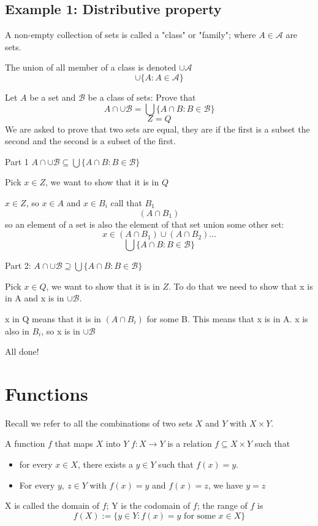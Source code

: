 \documentclass[12pt]{article}
\begin{document}
\subsection{Example 1: Distributive property}
A non-empty collection of sets is called a "class" or "family"; where $A\in\mathcal{A}$ are sets.

The union of all member of a class is denoted $\cup\mathcal{A}$
$$\cup\{A : A\in \mathcal{A}\}$$


Let $A$ be a set and $\mathcal{B}$ be a class of sets:
Prove that 
$$A\cap \cup\mathcal{B}=\bigcup\{A\cap B: B\in \mathcal{B}\}$$
$$Z=Q$$
We are asked to prove that two sets are equal, they are if the first is a subset the second and the second is a subset of the first.

Part 1 $A\cap \cup\mathcal{B}\subseteq \bigcup\{A\cap B: B\in \mathcal{B}\}$

Pick $x \in Z$, we want to show that it is in $Q$

$x \in Z$, so $x\in A$ and $x\in B_i$ call that $B_1$ 
$$(A\cap B_1)$$
so an element of a set is also the element of that set union some other set:
$$x\in(A\cap B_1)\cup(A\cap B_2)\ldots$$
$$\bigcup\{A\cap B: B\in \mathcal{B}\}$$



Part 2: $A\cap \cup\mathcal{B}\supseteq \bigcup\{A\cap B: B\in \mathcal{B}\}$

Pick $x \in Q$, we want to show that it is in $Z$.  To do that we need to show that x is in A and x is in $\cup\mathcal{B}$.

x in Q means that it is in $(A\cap B_i)$ for some B.  
This means that x is in A.
x is also in $B_i$, so x is in $\cup\mathcal{B}$

All done!
\pagebreak
\section{Functions}
Recall we refer to all the combinations of two sets $X$ and $Y$ with $X\times Y$.

A function $f$ that maps $X$ into $Y$ $f: X\rightarrow Y$
is a relation $f\subseteq X\times Y$ such that
\begin{itemize}
\item for every $x\in X$, there exists a $y \in Y$ such that $f(x)=y $.
\item For every $y,\ z \in Y$ with $f(x)=y $ and $f(x)=z $, we have $y=z$
\end{itemize}
X is called the domain of $f$; Y is the codomain of $f$; the range of $f$ is
$$f(X):=\{y\in Y: f(x)=y \textrm{ for some }x \in X\}$$
\end{document}
